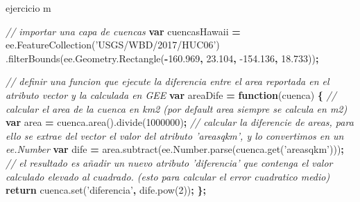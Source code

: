 \documentclass[
]{article}
\newenvironment{Shaded}{\begin{snugshade}}{\end{snugshade}}
\newcommand{\AttributeTok}[1]{\textcolor[rgb]{0.77,0.63,0.00}{#1}}
\newcommand{\CommentTok}[1]{\textcolor[rgb]{0.56,0.35,0.01}{\textit{#1}}}
\newcommand{\ControlFlowTok}[1]{\textcolor[rgb]{0.13,0.29,0.53}{\textbf{#1}}}
\newcommand{\DecValTok}[1]{\textcolor[rgb]{0.00,0.00,0.81}{#1}}
\newcommand{\FloatTok}[1]{\textcolor[rgb]{0.00,0.00,0.81}{#1}}
\newcommand{\KeywordTok}[1]{\textcolor[rgb]{0.13,0.29,0.53}{\textbf{#1}}}
\newcommand{\NormalTok}[1]{#1}
\newcommand{\OperatorTok}[1]{\textcolor[rgb]{0.81,0.36,0.00}{\textbf{#1}}}
\newcommand{\StringTok}[1]{\textcolor[rgb]{0.31,0.60,0.02}{#1}}
\newcommand{\VariableTok}[1]{\textcolor[rgb]{0.00,0.00,0.00}{#1}}
\begin{document}
ejercicio m

\begin{Shaded}
\begin{Highlighting}[]
\CommentTok{// importar una capa de cuencas}
\KeywordTok{var}\NormalTok{ cuencasHawaii }\OperatorTok{=} \VariableTok{ee}\NormalTok{.}\AttributeTok{FeatureCollection}\NormalTok{(}\StringTok{'USGS/WBD/2017/HUC06'}\NormalTok{)}
\NormalTok{  .}\AttributeTok{filterBounds}\NormalTok{(}\VariableTok{ee}\NormalTok{.}\VariableTok{Geometry}\NormalTok{.}\AttributeTok{Rectangle}\NormalTok{(}\OperatorTok{-}\FloatTok{160.969}\OperatorTok{,} \FloatTok{23.104}\OperatorTok{,} \FloatTok{-154.136}\OperatorTok{,} \FloatTok{18.733}\NormalTok{))}\OperatorTok{;}

\CommentTok{// definir una funcion que ejecute la diferencia entre el area reportada en el atributo vector y la calculada en GEE}
\KeywordTok{var}\NormalTok{ areaDife }\OperatorTok{=} \KeywordTok{function}\NormalTok{(cuenca) }\OperatorTok{\{}
  \CommentTok{// calcular el area de la cuenca en km2 (por default area siempre se calcula en m2)}
  \KeywordTok{var}\NormalTok{ area }\OperatorTok{=} \VariableTok{cuenca}\NormalTok{.}\AttributeTok{area}\NormalTok{().}\AttributeTok{divide}\NormalTok{(}\DecValTok{1000000}\NormalTok{)}\OperatorTok{;}
  \CommentTok{// calcular la diferencie de areas, para ello se extrae del vector el valor del atributo 'areasqkm', y lo convertimos en un ee.Number}
  \KeywordTok{var}\NormalTok{ dife }\OperatorTok{=} \VariableTok{area}\NormalTok{.}\AttributeTok{subtract}\NormalTok{(}\VariableTok{ee}\NormalTok{.}\VariableTok{Number}\NormalTok{.}\AttributeTok{parse}\NormalTok{(}\VariableTok{cuenca}\NormalTok{.}\AttributeTok{get}\NormalTok{(}\StringTok{'areasqkm'}\NormalTok{)))}\OperatorTok{;}
  \CommentTok{// el resultado es añadir un nuevo atributo 'diferencia' que contenga el valor calculado elevado al cuadrado. (esto para calcular el error cuadratico medio)}
  \ControlFlowTok{return} \VariableTok{cuenca}\NormalTok{.}\AttributeTok{set}\NormalTok{(}\StringTok{'diferencia'}\OperatorTok{,} \VariableTok{dife}\NormalTok{.}\AttributeTok{pow}\NormalTok{(}\DecValTok{2}\NormalTok{))}\OperatorTok{;}
\OperatorTok{\};}


\end{Highlighting}
\end{Shaded}
\end{document}

